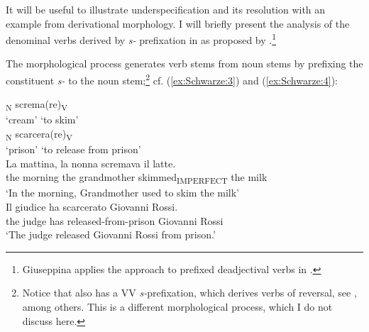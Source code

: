 \documentclass[output=paper]{langsci/langscibook}
\begin{document}

It will be useful to illustrate underspecification and its resolution with an example from derivational morphology. I will briefly present the analysis of the denominal verbs derived by \emph{s-} prefixation in  as proposed by %
\citet{Heusinger2006}%
%
.\footnote{Giuseppina %
\citet{Giuseppina2017} %
applies the %
\citet{Heusinger2006} 
 approach to prefixed deadjectival verbs in .}
 
The morphological process generates verb stems from noun stems by prefixing the constituent
\emph{s-} to the noun stem;\footnote{Notice that  also has a V\textrightarrow{}V \emph{s-}prefixation, which derives verbs of reversal, see %
\citet[932]{Mayo1995}%
%
, among others. This is a different morphological process, which I do not discuss here.} cf. (\ref{ex:Schwarze:3}) and (\ref{ex:Schwarze:4}):

\ea\label{ex:Schwarze:3}
    \ea\label{ex:Schwarze:3a} \textsubscript{N} \textrightarrow{}
    {screma(re)}\textsubscript{V} \\
    `cream' {} {`to skim'}\\
    \ex\label{ex:Schwarze:3b} \textsubscript{N} \textrightarrow{}
    {scarcera(re)}\textsubscript{V} \\
    `prison' {} {`to release from prison'}\\
    \z
\ex\label{ex:Schwarze:4}
    \ea\label{ex:Schwarze:4a} \gll La mattina, la nonna scremava il latte.\\
    the morning the grandmother skimmed\textsubscript{IMPERFECT} the milk\\
    \glt `In the morning, Grandmother used to skim the milk'\\

    \ex\label{ex:Schwarze:4b} \gll Il giudice ha scarcerato Giovanni Rossi. \\
    the judge has released-from-prison Giovanni Rossi \\
    \glt `The judge released Giovanni Rossi from prison.'\\
    \z
\z
\end{document}
